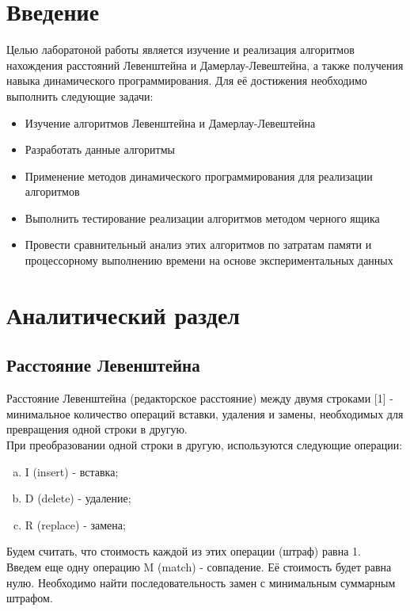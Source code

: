 \documentclass[12pt, a4paper]{article}
\begin{document}
	\lstset{language=Python}
	\section*{Введение}
	Целью лаборатоной работы является изучение и реализация алгоритмов нахождения расстояний
	Левенштейна и Дамерлау-Левештейна, а также получения навыка динамического программирования. Для её достижения необходимо выполнить следующие задачи:
	\begin{itemize}
		\item Изучение алгоритмов Левенштейна и Дамерлау-Левештейна
		\item Разработать данные алгоритмы
		\item Применение методов динамического программирования для реализации алгоритмов
		\item Выполнить тестирование реализации алгоритмов методом черного ящика
		\item Провести сравнительный анализ этих алгоритмов по затратам памяти и процессорному выполнению времени на основе экспериментальных данных
	\end{itemize}

	\newpage
	\section{Аналитический раздел}
		\subsection{Расстояние Левенштейна}
		Расстояние Левенштейна (редакторское расстояние) между двумя строками [1] - минимальное количество
		операций вставки, удаления и замены, необходимых для превращения одной строки в другую.\\
		При преобразовании одной строки в другую, используются следующие операции:
		\begin{enumerate}[a)]
			\item I (insert) - вставка;
			\item D (delete) - удаление;
			\item R (replace) - замена; 
		\end{enumerate}
		Будем считать, что стоимость каждой из этих операции (штраф) равна 1.\\
		Введем еще одну операцию M (match) - совпадение. Её стоимость будет равна нулю.
		Необходимо найти последовательность замен с минимальным суммарным штрафом.
		
\end{document}
